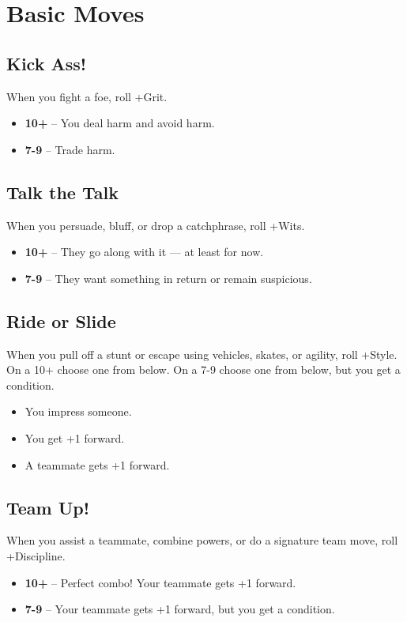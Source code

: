 \documentclass{book}
\begin{document}
\newpage

\chapter*{Basic Moves}

\section*{Kick Ass!}
When you fight a foe, roll +Grit.
\begin{itemize}
    \item \textbf{10+} -- You deal harm and avoid harm.
    \item \textbf{7-9} -- Trade harm.
\end{itemize}

\section*{Talk the Talk}
When you persuade, bluff, or drop a catchphrase, roll +Wits.
\begin{itemize}
    \item \textbf{10+} -- They go along with it — at least for now.
    \item \textbf{7-9} -- They want something in return or remain suspicious.
\end{itemize}

\section*{Ride or Slide}
When you pull off a stunt or escape using vehicles, skates, or agility, roll +Style. On a 10+ choose one from below. On a 7-9 choose one from below, but you get a condition.
\begin{itemize}
    \item You impress someone.
    \item You get +1 forward.
    \item A teammate gets +1 forward.
\end{itemize}

\section*{Team Up!}
When you assist a teammate, combine powers, or do a signature team move, roll +Discipline.
\begin{itemize}
    \item \textbf{10+} -- Perfect combo! Your teammate gets +1 forward.
    \item \textbf{7-9} -- Your teammate gets +1 forward, but you get a condition.
\end{itemize}
\end{document}
